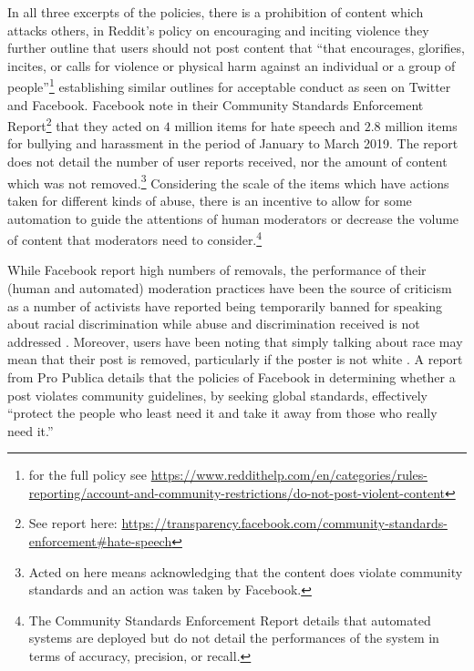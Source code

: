 In all three excerpts of the policies, there is a prohibition of content which attacks others, in Reddit's policy on encouraging and inciting violence they further outline that users should not post content that ``that encourages, glorifies, incites, or calls for violence or physical harm against an individual or a group of people''\footnote{for the full policy see \url{https://www.reddithelp.com/en/categories/rules-reporting/account-and-community-restrictions/do-not-post-violent-content}}
establishing similar outlines for acceptable conduct as seen on Twitter and Facebook. Facebook note in their Community Standards Enforcement Report\footnote{See report here: \url{https://transparency.facebook.com/community-standards-enforcement\#hate-speech}} that they acted on $4$ million items for hate speech and $2.8$ million items for bullying and harassment in the period of January to March 2019. The report does not detail the number of user reports received, nor the amount of content which was not removed.\footnote{Acted on here means acknowledging that the content does violate community standards and an action was taken by Facebook.} Considering the scale of the items which have actions taken for different kinds of abuse, there is an incentive to allow for some automation to guide the attentions of human moderators or decrease the volume of content that moderators need to consider.\footnote{The Community Standards Enforcement Report details that automated systems are deployed but do not detail the performances of the system in terms of accuracy, precision, or recall.}

While Facebook report high numbers of removals, the performance of their (human and automated) moderation practices have been the source of criticism as a number of activists have reported being temporarily banned for speaking about racial discrimination while abuse and discrimination received is not addressed \citep{Sharif:2019}.
Moreover, users have been noting that simply talking about race may mean that their post is removed, particularly if the poster is not white \citep{Guynn:2019}. A report from Pro Publica details that the policies of Facebook in determining whether a post violates community guidelines, by seeking global standards, effectively ``protect the people who least need it and take it away from those who really need it.'' \citep{Angwin:2017}

